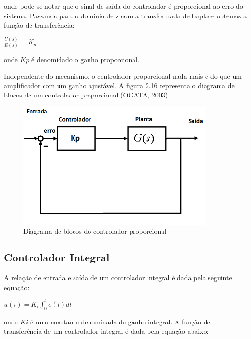 \noindent onde pode-se notar que o sinal de saída do controlador é proporcional ao erro do sistema. Passando para o domínio de $s$ com a transformada de Laplace obtemos a função de transferência:

\begin{center}
$\frac {U(s)}{E(s)} = K_p$
\end{center}

\noindent onde $Kp$ é denomidado o ganho proporcional.

Independente do mecanismo, o controlador proporcional nada mais é do que um amplificador com um ganho ajustável. A figura 2.16 representa o diagrama de blocos de um controlador proporcional (OGATA, 2003).

\begin{figure}[H]

\center

\includegraphics[width=10cm]{imagens/planta_proporcional.png}

\label{Diagrama de blocos do controlador proporcional}

\caption{Diagrama de blocos do controlador proporcional}

\end{figure}

\subsection{Controlador Integral}
A relação de entrada e saída de um controlador integral é dada pela seguinte equação:

\begin{center}
$ u(t) = K_i \int_0^t e(t)dt$
\end{center}

\noindent onde $Ki$ é uma constante denominada de ganho integral. A função de transferência de um controlador integral é dada pela equação abaixo:

